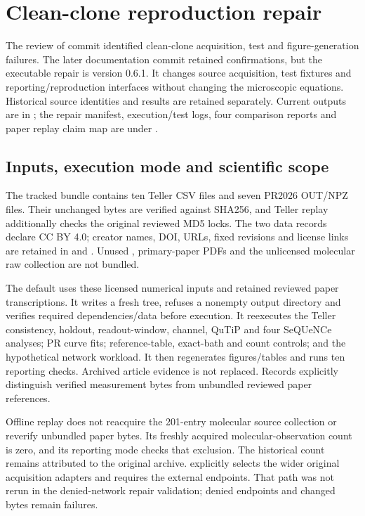 \section{Clean-clone reproduction repair}
\label{sec:repair}
The review of commit  identified clean-clone acquisition, test and figure-generation failures. The later documentation commit retained confirmations, but the executable repair is version 0.6.1. It changes source acquisition, test fixtures and reporting/reproduction interfaces without changing the microscopic equations. Historical source identities and results are retained separately. Current outputs are in ; the repair manifest, execution/test logs, four comparison reports and paper replay claim map are under .

\subsection{Inputs, execution mode and scientific scope}
The tracked bundle contains ten Teller CSV files and seven PR2026 OUT/NPZ files. Their unchanged bytes are verified against SHA256, and Teller replay additionally checks the original reviewed MD5 locks. The two data records declare CC BY 4.0; creator names, DOI, URLs, fixed revisions and license links are retained in  and . Unused , primary-paper PDFs and the unlicensed molecular raw collection are not bundled.

The default  uses these licensed numerical inputs and retained reviewed paper transcriptions. It writes a fresh tree, refuses a nonempty output directory and verifies required dependencies/data before execution. It reexecutes the Teller consistency, holdout, readout-window, channel, QuTiP and four SeQUeNCe analyses; PR curve fits; reference-table, exact-bath and count controls; and the hypothetical network workload. It then regenerates figures/tables and runs ten reporting checks. Archived article evidence is not replaced. Records explicitly distinguish verified measurement bytes from unbundled reviewed paper references.

Offline replay does not reacquire the 201-entry molecular source collection or reverify unbundled paper bytes. Its freshly acquired molecular-observation count is zero, and its reporting mode checks that exclusion. The historical count remains attributed to the original archive.  explicitly selects the wider original acquisition adapters and requires the external endpoints. That path was not rerun in the denied-network repair validation; denied endpoints and changed bytes remain failures.

